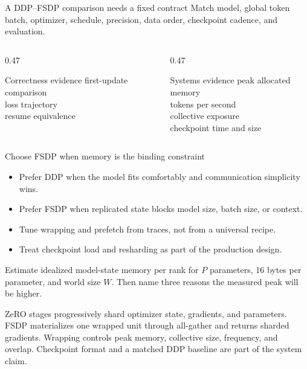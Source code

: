 \documentclass[handout]{beamer}
\begin{document}
\begin{frame}{A DDP--FSDP comparison needs a fixed contract}
  Match model, global token batch, optimizer, schedule, precision, data order, checkpoint cadence, and evaluation.
  \vspace{7pt}
  \begin{columns}[t]
    \begin{column}{0.47\linewidth}
      \begin{block}{Correctness evidence}
        first-update comparison\\loss trajectory\\resume equivalence
      \end{block}
    \end{column}
    \begin{column}{0.47\linewidth}
      \begin{block}{Systems evidence}
        peak allocated memory\\tokens per second\\collective exposure\\checkpoint time and size
      \end{block}
    \end{column}
  \end{columns}
\end{frame}

\begin{frame}{Choose FSDP when memory is the binding constraint}
  \begin{itemize}
    \setlength{\itemsep}{8pt}
    \item Prefer DDP when the model fits comfortably and communication simplicity wins.
    \item Prefer FSDP when replicated state blocks model size, batch size, or context.
    \item Tune wrapping and prefetch from traces, not from a universal recipe.
    \item Treat checkpoint load and resharding as part of the production design.
  \end{itemize}
\end{frame}

  {Estimate idealized model-state memory per rank for $P$ parameters, 16 bytes per parameter, and world size $W$. Then name three reasons the measured peak will be higher.}

\takeaways
  {ZeRO stages progressively shard optimizer state, gradients, and parameters.}
  {FSDP materializes one wrapped unit through all-gather and returns sharded gradients.}
  {Wrapping controls peak memory, collective size, frequency, and overlap.}
  {Checkpoint format and a matched DDP baseline are part of the system claim.}
\end{document}
